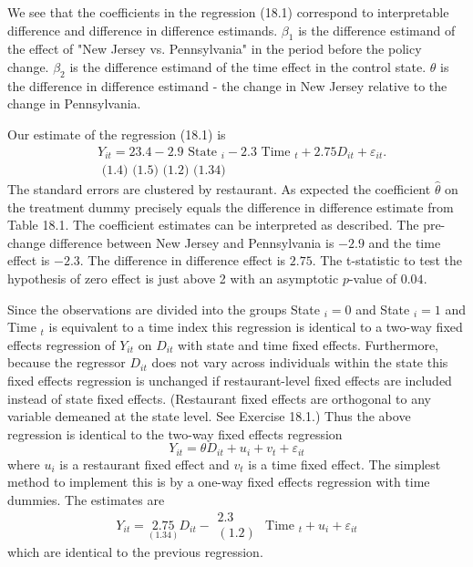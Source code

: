 \documentclass[10pt]{article}
\begin{document}
We see that the coefficients in the regression (18.1) correspond to interpretable difference and difference in difference estimands. $\beta_{1}$ is the difference estimand of the effect of "New Jersey vs. Pennsylvania" in the period before the policy change. $\beta_{2}$ is the difference estimand of the time effect in the control state. $\theta$ is the difference in difference estimand - the change in New Jersey relative to the change in Pennsylvania.

Our estimate of the regression (18.1) is
$$
\begin{aligned}
& Y_{i t}=23.4-2.9 \text { State }_{i}-2.3 \text { Time }_{t}+2.75 D_{i t}+\varepsilon_{i t} . \\
& \text { (1.4) (1.5) (1.2) (1.34) }
\end{aligned}
$$
The standard errors are clustered by restaurant. As expected the coefficient $\widehat{\theta}$ on the treatment dummy precisely equals the difference in difference estimate from Table 18.1. The coefficient estimates can be interpreted as described. The pre-change difference between New Jersey and Pennsylvania is $-2.9$ and the time effect is $-2.3$. The difference in difference effect is $2.75$. The t-statistic to test the hypothesis of zero effect is just above 2 with an asymptotic $p$-value of $0.04$.

Since the observations are divided into the groups State $_{i}=0$ and State $_{i}=1$ and Time $_{t}$ is equivalent to a time index this regression is identical to a two-way fixed effects regression of $Y_{i t}$ on $D_{i t}$ with state and time fixed effects. Furthermore, because the regressor $D_{i t}$ does not vary across individuals within the state this fixed effects regression is unchanged if restaurant-level fixed effects are included instead of state fixed effects. (Restaurant fixed effects are orthogonal to any variable demeaned at the state level. See Exercise 18.1.) Thus the above regression is identical to the two-way fixed effects regression
$$
Y_{i t}=\theta D_{i t}+u_{i}+v_{t}+\varepsilon_{i t}
$$
where $u_{i}$ is a restaurant fixed effect and $v_{t}$ is a time fixed effect. The simplest method to implement this is by a one-way fixed effects regression with time dummies. The estimates are
$$
Y_{i t}=\underset{(1.34)}{2.75} D_{i t}-\begin{gathered}
2.3 \\
(1.2)
\end{gathered} \text { Time }_{t}+u_{i}+\varepsilon_{i t}
$$
which are identical to the previous regression.
\end{document}

